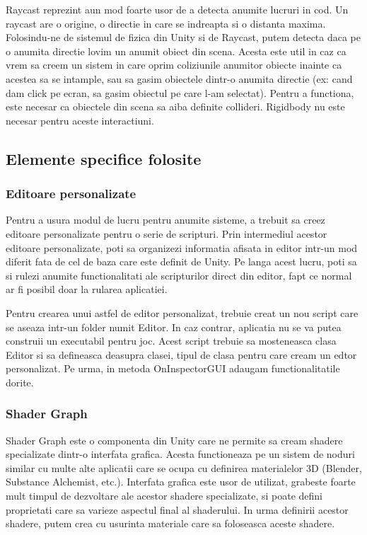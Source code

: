 \documentclass[12pt, a4paper]{article}
\begin{document}
	Raycast reprezint aun mod foarte usor de a detecta anumite lucruri in cod. Un raycast are o origine, o directie in care se indreapta si o distanta maxima. Folosindu-ne de sistemul de fizica din Unity si de Raycast, putem detecta daca pe o anumita directie lovim un anumit obiect din scena. Acesta este util in caz ca vrem sa creem un sistem in care oprim coliziunile anumitor obiecte inainte ca acestea sa se intample, sau sa gasim obiectele dintr-o anumita directie (ex: cand dam click pe ecran, sa gasim obiectul pe care l-am selectat). Pentru a functiona, este necesar ca obiectele din scena sa aiba definite collideri. Rigidbody nu este necesar pentru aceste interactiuni.
	



	\subsection{Elemente specifice folosite}
	\label{section: specificElements}	
	
	\subsubsection{Editoare personalizate}
	
	Pentru a usura modul de lucru pentru anumite sisteme, a trebuit sa creez editoare personalizate pentru o serie de scripturi. Prin intermediul acestor editoare personalizate, poti sa organizezi informatia afisata in editor intr-un mod diferit fata de cel de baza care este definit de Unity. Pe langa acest lucru, poti sa si rulezi anumite functionalitati ale scripturilor direct din editor, fapt ce normal ar fi posibil doar la rularea aplicatiei.
	\newline
	
	Pentru crearea unui astfel de editor personalizat, trebuie creat un nou script care se aseaza intr-un folder numit Editor. In caz contrar, aplicatia nu se va putea construii un executabil pentru joc. Acest script trebuie sa mosteneasca clasa Editor si sa defineasca deasupra clasei, tipul de clasa pentru care cream un edtor personalizat. Pe urma, in metoda OnInspectorGUI adaugam functionalitatile dorite.
	
	
	
	
	
	\subsubsection{Shader Graph}
	
	Shader Graph este o componenta din Unity care ne permite sa cream shadere specializate dintr-o interfata grafica. Acesta functioneaza pe un sistem de noduri similar cu multe alte aplicatii care se ocupa cu definirea materialelor 3D (Blender, Substance Alchemist, etc.). Interfata grafica este usor de utilizat, grabeste foarte mult timpul de dezvoltare ale acestor shadere specializate, si poate defini proprietati care sa varieze aspectul final al shaderului. In urma definirii acestor shadere, putem crea cu usurinta materiale care sa foloseasca aceste shadere.
	
\end{document}
